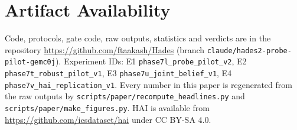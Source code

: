 \documentclass[conference]{IEEEtran}
\begin{document}
\section*{Artifact Availability}
Code, protocols, gate code, raw outputs, statistics and verdicts are in the repository
\url{https://github.com/ftaakash/Hades} (branch \texttt{claude/hades2-probe-pilot-gemc0j}). Experiment IDs:
E1 \texttt{phase7l\_probe\_pilot\_v2}, E2 \texttt{phase7t\_robust\_pilot\_v1}, E3 \texttt{phase7u\_joint\_belief\_v1},
E4 \texttt{phase7v\_hai\_replication\_v1}. Every number in this paper is regenerated from the raw outputs by
\texttt{scripts/paper/recompute\_headlines.py} and \texttt{scripts/paper/make\_figures.py}. HAI is available from
\url{https://github.com/icsdataset/hai} under CC BY-SA 4.0.



\end{document}
